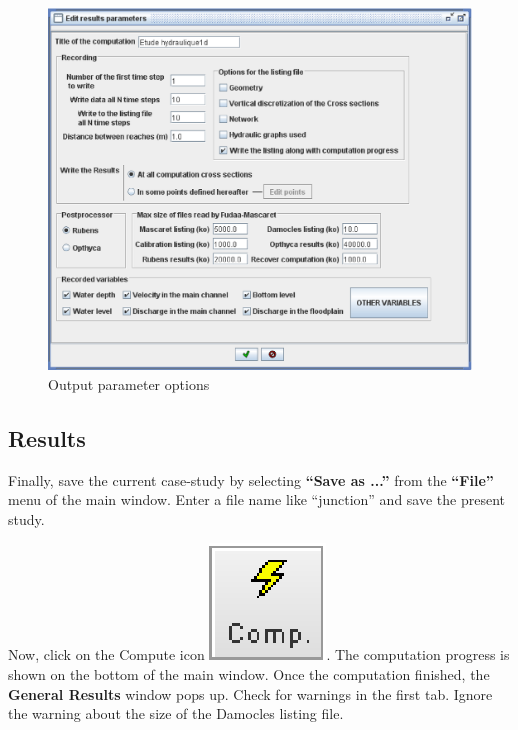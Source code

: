 \documentclass[a4paper,12pt]{article}
\begin{document}
\begin{figure}[h]
  \begin{center}
  \includegraphics[scale=0.5]{output-params}
  \caption{Output parameter options}
  \label{fig:Output-parameter-options}
  \end{center}
\end{figure}



\subsection{Results}

\hspace{0.5cm} Finally, save the current case-study by selecting
\textbf{{}``Save as ...''} from the \textbf{{}``File''} menu of
the main window. Enter a file name like {}``junction'' and save
the present study.

\vspace{0.5cm}

Now, click on the Compute icon \includegraphics[scale=0.6]{compute}.
The computation progress is shown on the bottom of the main window.
Once the computation finished, the \textbf{General Results} window
pops up. Check for warnings in the first tab. Ignore the warning
about the size of the Damocles listing file. 
\end{document}

